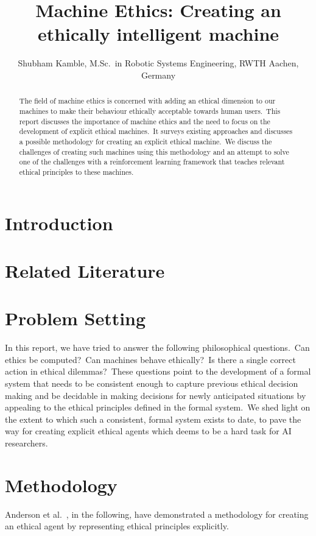 \documentclass[10pt, a4paper, twocolumn]{article}
\title{Machine Ethics: Creating an ethically intelligent machine}
\author{Shubham Kamble, M.Sc.\ in Robotic Systems Engineering, RWTH Aachen, Germany}
\date{}
\begin{document}
\maketitle

\begin{abstract}
The field of machine ethics is concerned with adding an ethical dimension to our machines to make their behaviour ethically acceptable towards human users.\ This report discusses the importance of machine ethics and the need to focus on the development of explicit ethical machines.\ It surveys existing approaches and discusses a possible methodology for creating an explicit ethical machine.\ We discuss the challenges of creating such machines using this methodology and an attempt to solve one of the challenges with a reinforcement learning framework that teaches relevant ethical principles to these machines.
\end{abstract}

\section{Introduction}


\section{Related Literature}


\section{Problem Setting}
In this report, we have tried to answer the following philosophical questions.\ Can ethics be computed?\ Can machines behave ethically?\ Is there a single correct action in ethical dilemmas?\ These questions point to the development of a formal system that needs to be consistent enough to capture previous ethical decision making and be decidable in making decisions for newly anticipated situations by appealing to the ethical principles defined in the formal system.\ We shed light on the extent to which such a consistent, formal system exists to date, to pave the way for creating explicit ethical agents which deems to be a hard task for AI researchers.

\section{Methodology}
Anderson et al.\ \cite[pp.~22--25]{Anderson_Anderson_2007}, in the following, have demonstrated a methodology for creating an ethical agent by representing ethical principles explicitly.

\end{document}

